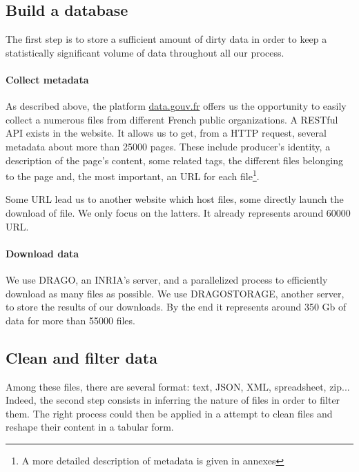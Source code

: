 \documentclass[a4paper]{article}
\begin{document}
	
	\subsection{Build a database}
	
	The first step is to store a sufficient amount of dirty data in order to keep a statistically significant volume of data throughout all our process.
	
	\paragraph{Collect metadata}
	
	As described above, the platform \href{http://www.data.gouv.fr/fr/}{data.gouv.fr} offers us the opportunity to easily collect a numerous files from different French public organizations. A RESTful API exists in the website. It allows us to get, from a HTTP request, several metadata about more than 25000 pages. These include producer's identity, a description of the page's content, some related tags, the different files belonging to the page and, the most important, an URL for each file\footnote{A more detailed description of metadata is given in annexes}. 
	
	Some URL lead us to another website which host files, some directly launch the download of file. We only focus on the latters. It already represents around 60000 URL.
	
	\paragraph{Download data}
	
	We use DRAGO, an INRIA's server, and a parallelized process to efficiently download as many files as possible. We use DRAGOSTORAGE, another server, to store the results of our downloads. By the end it represents around 350 Gb of data for more than 55000 files.
	
	\subsection{Clean and filter data}
	
	Among these files, there are several format: text, JSON, XML, spreadsheet, zip... Indeed, the second step consists in inferring the nature of files in order to filter them. The right process could then be applied in a attempt to clean files and reshape their content in a tabular form.
	
\end{document}
